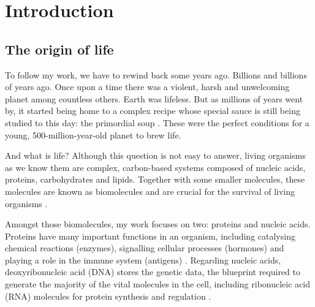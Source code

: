 \chapter{Introduction}

\section{The origin of life}

To follow my work, we have to rewind back some years ago. Billions and billions of years ago.
Once upon a time there was a violent, harsh and unwelcoming planet among countless others. Earth was lifeless. But as millions of years went by, it started being home to a complex recipe whose special sauce is still being studied to this day: the primordial soup \cite{gilbert:1986td}. These were the perfect conditions for a young, 500-million-year-old planet to brew life.

And what is life? Although this question is not easy to answer, living organisms as we know them are complex, carbon-based systems composed of nucleic acids, proteins, carbohydrates and lipids. Together with some smaller molecules, these molecules are known as biomolecules and are crucial for the survival of living organisms \cite{alberts:2008vj}.

Amongst those biomolecules, my work focuses on two: proteins and nucleic acids. Proteins have many important functions in an organism, including catalysing chemical reactions (enzymes), signalling cellular processes (hormones) and playing a role in the immune system (antigens) \cite{alberts:2008vj}. Regarding nucleic acids, deoxyribonucleic acid (DNA) stores the genetic data, the blueprint required to generate the majority of the vital molecules in the cell, including ribonucleic acid (RNA) molecules for protein synthesis and regulation \cite{alberts:2008vj}.


